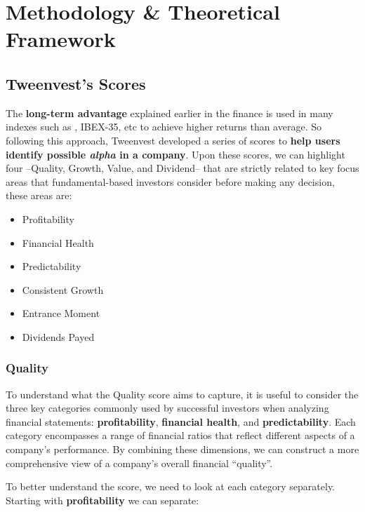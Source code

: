 \documentclass[11pt,english,a4paper,hidelinks]{book}
\begin{document}
\chapter{Methodology \& Theoretical Framework}


\section{Tweenvest's Scores}

The \textbf{long-term advantage} explained earlier in the finance is used in many indexes such as \textcite{msci2024fundamental}, IBEX-35, etc to achieve higher returns than average. So following this approach, Tweenvest developed a series of scores to \textbf{help users identify possible \textit{alpha} in a company}. Upon these scores, we can highlight four --Quality, Growth, Value, and Dividend-- that are strictly related to key focus areas that fundamental-based investors consider before making any decision, these areas are:
\begin{itemize}
    \item Profitability
    \item Financial Health
    \item Predictability
    \item Consistent Growth
    \item Entrance Moment
    \item Dividends Payed
\end{itemize}

\subsection{Quality}

\noindent To understand what the Quality score aims to capture, it is useful to consider the three key categories commonly used by successful investors when analyzing financial statements: \textbf{profitability}, \textbf{financial health}, and \textbf{predictability}. Each category encompasses a range of financial ratios that reflect different aspects of a company's performance. By combining these dimensions, we can construct a more comprehensive view of a company's overall financial ``quality''.


\vspace{0.5cm}
\noindent To better understand the score, we need to look at each category separately. Starting with \textbf{profitability} we can separate:
\end{document}
